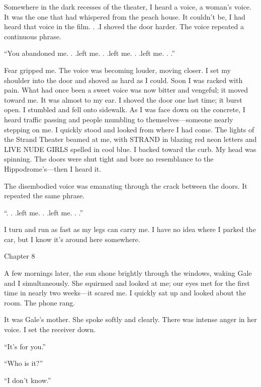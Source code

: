 Somewhere in the dark recesses of the theater, I heard a voice, a
woman's voice. It was the one that had whispered from the peach house.
It couldn't be, I had heard that voice in the film. . .I shoved the door
harder. The voice repeated a continuous phrase.

``You abandoned me. . .left me. . .left me. . .left me. . .''

Fear gripped me. The voice was becoming louder, moving closer. I set my
shoulder into the door and shoved as hard as I could. Soon I was racked
with pain. What had once been a sweet voice was now bitter and vengeful;
it moved toward me. It was almost to my ear. I shoved the door one last
time; it burst open. I stumbled and fell onto sidewalk. As I was face
down on the concrete, I heard traffic passing and people mumbling to
themselves---someone nearly stepping on me. I quickly stood and looked
from where I had come. The lights of the Strand Theater beamed at me,
with STRAND in blazing red neon letters and LIVE NUDE GIRLS spelled in
cool blue. I backed toward the curb. My head was spinning. The doors
were shut tight and bore no resemblance to the Hippodrome's---then I
heard it.

The disembodied voice was emanating through the crack between the doors.
It repeated the same phrase.

``. . .left me. . .left me. . .''

I turn and run as fast as my legs can carry me. I have no idea where I
parked the car, but I know it's around here somewhere.

Chapter 8

A few mornings later, the sun shone brightly through the windows, waking
Gale and I simultaneously. She squirmed and looked at me; our eyes met
for the first time in nearly two weeks---it scared me. I quickly sat up
and looked about the room. The phone rang.

It was Gale's mother. She spoke softly and clearly. There was intense
anger in her voice. I set the receiver down.

``It's for you.''

``Who is it?''

``I don't know.''

